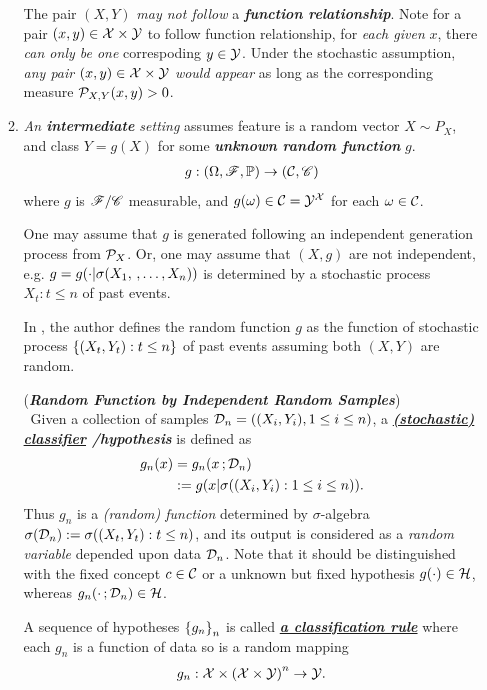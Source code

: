 \documentclass[11pt]{article}
\begin{document}
\begin{itemize}
\begin{remark}
\begin{enumerate}
The pair $(X, Y)$ \emph{may not follow} a \emph{\textbf{function relationship}}. Note for a pair $(x, y) \in {\mathcal X} \times {\mathcal Y}$ to follow function relationship, for \emph{each given} $x$, there \emph{can only be one} correspoding $y \in {\mathcal Y}$. Under the stochastic assumption, \emph{any pair $(x,y)  \in {\mathcal X} \times {\mathcal Y}$ would appear} as long as the corresponding measure ${\mathcal P}_{X,Y}(x, y) >0$. 

\item \emph{An \textbf{intermediate} setting} assumes feature is a random vector $X \sim P_{X}$, and class $Y = g(X)$ for some \emph{\textbf{unknown random function}} $g$.
\begin{align*}
g: (\Omega, {\mathscr F}, {\mathbb P}) \to ({\mathcal C}, {\mathscr C})
\end{align*} where $g$ is ${\mathscr F}/{\mathscr C}$ measurable, and $g(\omega) \in {\mathcal C} = {\mathcal Y}^{{\mathcal X}}$ for each $\omega \in {\mathcal C}$. 

One may assume that $g$ is generated following an independent generation process from ${\mathcal P}_X$. Or, one may assume that $(X, g)$ are not independent, e.g. $g = g(\cdot| \sigma(X_1,  \,{,}\ldots{,}\, X_n))$ is determined by a stochastic process $X_t: t \le n$ of past events.

In  \citep{devroye2013probabilistic}, the author defines the random function $g$ as the function of stochastic process $\left\{(X_t, Y_t): t \le n\right\}$ of past events assuming both $(X, Y)$ are random.
\begin{definition} (\emph{\textbf{Random Function by Independent Random Samples}})  \citep{devroye2013probabilistic} \\\
Given a collection of samples ${\mathcal D}_{n} = ((X_{i}, Y_{i}), 1\le i\le n)$, a \emph{\textbf{\underline{(stochastic) classifier} /hypothesis}} is defined as
\begin{align*}
g_{n}(x)&=g_{n}(x\,; {\mathcal D}_{n}) \\
&:= g(x | \sigma((X_i, Y_i): 1 \le i \le n)).
\end{align*}
Thus $g_{n}$ is a \emph{(random) function} determined by $\sigma$-algebra $\sigma({\mathcal D}_n) := \sigma((X_t, Y_t): t \le n)$, and its output is considered as a \emph{random variable} depended upon data ${\mathcal D}_n$.  Note that it should be distinguished with the fixed concept $c\in {\mathcal C}$ or a unknown but fixed hypothesis $g(\cdot)\in {\mathcal H}$, whereas $g_{n}(\cdot\,; {\mathcal D}_{n})\in {\mathcal H}$.

A sequence of hypotheses $\left\{g_n\right\}_n$ is called \underline{\emph{\textbf{a classification rule}}} where each $g_n$ is a function of data so is a random mapping
\begin{align*}
g_n: {\mathcal X} \times \left({\mathcal X} \times {\mathcal Y}\right)^n \to {\mathcal Y}.
\end{align*}
\end{definition}
\end{enumerate}
\end{remark}


\end{itemize}
\end{document}
